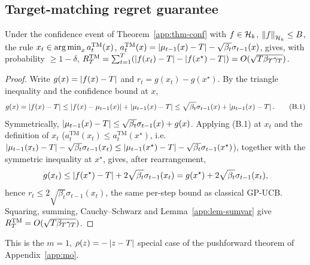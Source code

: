 \subsection{Target-matching regret guarantee}

\begin{theorem}
\label{app:thm-tmsoc}
Under the confidence event of Theorem~\ref{app:thm-conf} with $f\in\mathcal{H}_k$,
$\left\lVert f\right\rVert_{\mathcal{H}_k}\le B$, the rule $x_t\in\operatorname*{arg\,min}_x a_t^{\mathrm{TM}}(x)$,
$a_t^{\mathrm{TM}}(x)=\left\lvert \mu_{t-1}(x)-T\right\rvert-\sqrt{\beta_t}\sigma_{t-1}(x)$, gives,
with probability $\ge1-\delta$,
$R_T^{\mathrm{TM}}=\sum_{t=1}^T(\left\lvert f(x_t)-T\right\rvert-\left\lvert f(x^\star)-T\right\rvert)
=O(\sqrt{T\beta_T\gamma_T})$.
\end{theorem}

\begin{proof}
Write $g(x)=\left\lvert f(x)-T\right\rvert$ and $r_t=g(x_t)-g(x^\star)$. By the triangle inequality
and the confidence bound at $x$,
\[
g(x)=\left\lvert f(x)-T\right\rvert\le\left\lvert f(x)-\mu_{t-1}(x)\right\rvert+\left\lvert \mu_{t-1}(x)-T\right\rvert
\le\sqrt{\beta_t}\sigma_{t-1}(x)+\left\lvert \mu_{t-1}(x)-T\right\rvert.
\tag{B.1}
\]
Symmetrically, $\left\lvert \mu_{t-1}(x)-T\right\rvert\le\sqrt{\beta_t}\sigma_{t-1}(x)+g(x)$.
Applying (B.1) at $x_t$ and the definition of $x_t$
($a_t^{\mathrm{TM}}(x_t)\le a_t^{\mathrm{TM}}(x^\star)$, i.e.\
$\left\lvert \mu_{t-1}(x_t)-T\right\rvert-\sqrt{\beta_t}\sigma_{t-1}(x_t)\le
\left\lvert \mu_{t-1}(x^\star)-T\right\rvert-\sqrt{\beta_t}\sigma_{t-1}(x^\star)$), together with the
symmetric inequality at $x^\star$, gives, after rearrangement,
\[
g(x_t)\le\left\lvert f(x^\star)-T\right\rvert+2\sqrt{\beta_t}\sigma_{t-1}(x_t)
=g(x^\star)+2\sqrt{\beta_t}\sigma_{t-1}(x_t),
\]
hence $r_t\le2\sqrt{\beta_t}\sigma_{t-1}(x_t)$, the same per-step bound as
classical GP-UCB. Squaring, summing, Cauchy--Schwarz and
Lemma~\ref{app:lem-sumvar} give $R_T^{\mathrm{TM}}=O(\sqrt{T\beta_T\gamma_T})$.
\end{proof}

\noindent This is the $m=1$, $\rho(z)=-\left\lvert z-T\right\rvert$ special case of the pushforward
theorem of Appendix~\ref{app:mo}.
